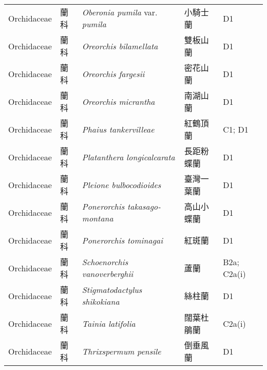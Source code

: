 {\begin{longtable}{p{2.5cm}p{2.5cm}p{4.5cm}p{2.5cm}p{3cm}}
    Orchidaceae & 蘭科 & \textit{Oberonia pumila} var. \textit{pumila}  & 小騎士蘭 & D1 \index{Oberonia@\textit{Oberonia}!pumila@\textit{pumila}!var. pumila@var. \textit{pumila}}  \index{小騎士蘭} \\
    Orchidaceae & 蘭科 & \textit{Oreorchis bilamellata}  & 雙板山蘭 & D1 \index{Oreorchis@\textit{Oreorchis}!bilamellata@\textit{bilamellata}}  \index{雙板山蘭} \\
    Orchidaceae & 蘭科 & \textit{Oreorchis fargesii}  & 密花山蘭 & D1 \index{Oreorchis@\textit{Oreorchis}!fargesii@\textit{fargesii}}  \index{密花山蘭} \\
    Orchidaceae & 蘭科 & \textit{Oreorchis micrantha}  & 南湖山蘭 & D1 \index{Oreorchis@\textit{Oreorchis}!micrantha@\textit{micrantha}}  \index{南湖山蘭} \\
    Orchidaceae & 蘭科 & \textit{Phaius tankervilleae}  & 紅鶴頂蘭 & C1; D1 \index{Phaius@\textit{Phaius}!tankervilleae@\textit{tankervilleae}}  \index{紅鶴頂蘭} \\
    Orchidaceae & 蘭科 & \textit{Platanthera longicalcarata}  & 長距粉蝶蘭 & D1 \index{Platanthera@\textit{Platanthera}!longicalcarata@\textit{longicalcarata}}  \index{長距粉蝶蘭} \\
    Orchidaceae & 蘭科 & \textit{Pleione bulbocodioides}  & 臺灣一葉蘭 & D1 \index{Pleione@\textit{Pleione}!bulbocodioides@\textit{bulbocodioides}}  \index{臺灣一葉蘭} \\
    Orchidaceae & 蘭科 & \textit{Ponerorchis takasago-montana}  & 高山小蝶蘭 & D1 \index{Ponerorchis@\textit{Ponerorchis}!takasago-montana@\textit{takasago-montana}}  \index{高山小蝶蘭} \\
    Orchidaceae & 蘭科 & \textit{Ponerorchis tominagai}  & 紅斑蘭 & D1 \index{Ponerorchis@\textit{Ponerorchis}!tominagai@\textit{tominagai}}  \index{紅斑蘭} \\
    Orchidaceae & 蘭科 & \textit{Schoenorchis vanoverberghii}  & 蘆蘭 & B2a; C2a(i) \index{Schoenorchis@\textit{Schoenorchis}!vanoverberghii@\textit{vanoverberghii}}  \index{蘆蘭} \\
    Orchidaceae & 蘭科 & \textit{Stigmatodactylus shikokiana}  & 絲柱蘭 & D1 \index{Stigmatodactylus@\textit{Stigmatodactylus}!shikokiana@\textit{shikokiana}}  \index{絲柱蘭} \\
    Orchidaceae & 蘭科 & \textit{Tainia latifolia}  & 闊葉杜鵑蘭 & C2a(i) \index{Tainia@\textit{Tainia}!latifolia@\textit{latifolia}}  \index{闊葉杜鵑蘭} \\
    Orchidaceae & 蘭科 & \textit{Thrixspermum pensile}  & 倒垂風蘭 & D1 \index{Thrixspermum@\textit{Thrixspermum}!pensile@\textit{pensile}}  \index{倒垂風蘭} \\

\end{longtable}}
